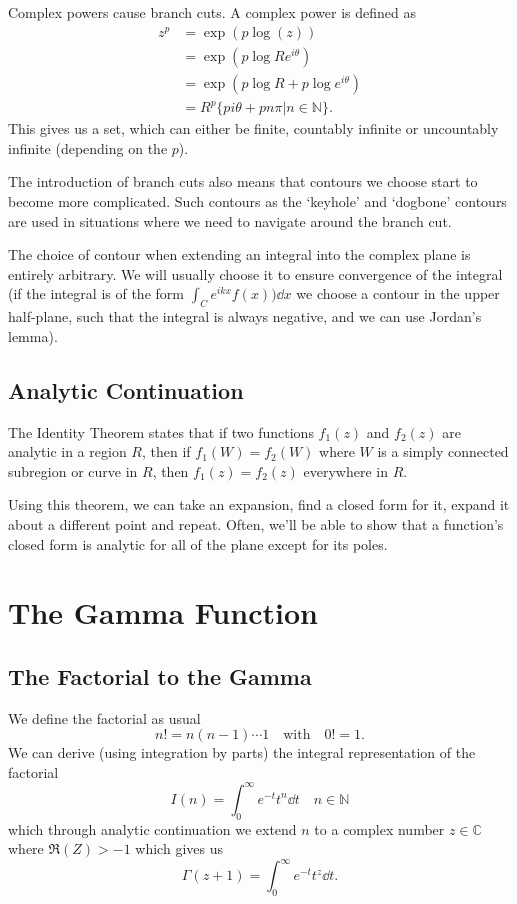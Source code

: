 \documentclass[a4paper,12pt,parskip=full,BCOR=1cm]{scrreprt}
\begin{document}
Complex powers cause branch cuts.
A complex power is defined as
\begin{align*}
 z^p & = \exp(p\log(z))                          \\
     & = \exp(p\log{Re^{i\theta}})               \\
     & = \exp(p\log{R} + p\log{e^{i\theta}})     \\
     & = R^p\{pi\theta + pn\pi|n\in\mathbb{N}\}.
\end{align*}
This gives us a set, which can either be finite, countably infinite or uncountably infinite (depending on the $p$).

The introduction of branch cuts also means that contours we choose start to become more complicated.
Such contours as the `keyhole' and `dogbone' contours are used in situations where we need to navigate around the branch cut.

The choice of contour when extending an integral into the complex plane is entirely arbitrary.
We will usually choose it to ensure convergence of the integral (if the integral is of the form $\int_C e^{ikx}f(x))\dd{x}$ we choose a contour in the upper half-plane, such that the integral is always negative, and we can use Jordan's lemma).

\section{Analytic Continuation}
The Identity Theorem states that if two functions $f_1(z)$ and $f_2(z)$ are analytic in a region $R$, then if $f_1(W)=f_2(W)$ where $W$ is a simply connected subregion or curve in $R$, then $f_1(z)=f_2(z)$ everywhere in $R$.

Using this theorem, we can take an expansion, find a closed form for it, expand it about a different point and repeat.
Often, we'll be able to show that a function's closed form is analytic for all of the plane except for its poles.

\chapter{The Gamma Function}
\section{The Factorial to the Gamma}
We define the factorial as usual
$$n! = n(n-1)\cdots1 \quad \textrm{with}\quad 0! = 1.$$
We can derive (using integration by parts) the integral representation of the factorial $$I(n) = \int_0^\infty e^{-t}t^n\dd{t}\quad n\in\mathbb{N}$$ which through analytic continuation we extend $n$ to a complex number $z\in\mathbb{C}$ where $\Re(Z)>-1$ which gives us $$\Gamma (z+1) = \int_0^\infty e^{-t}t^z\dd{t}.$$
\end{document}

